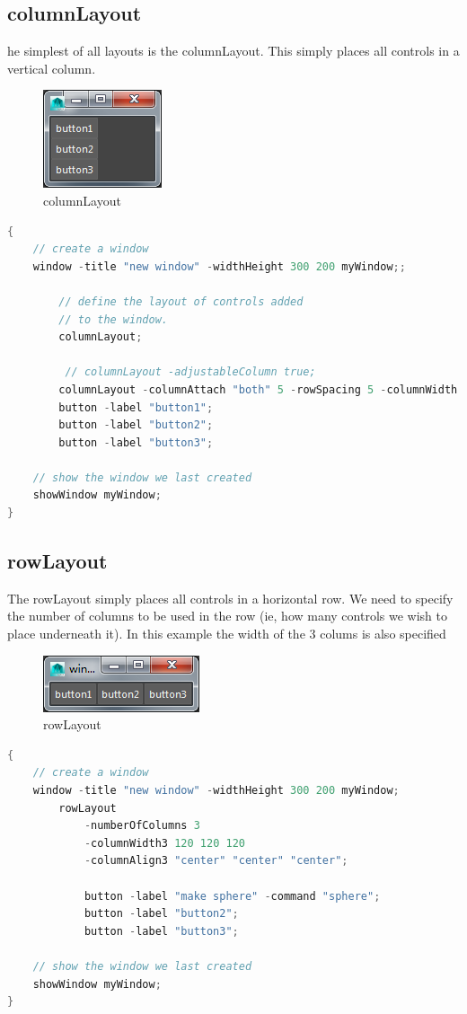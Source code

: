 \subsection{columnLayout}
he simplest of all layouts is the columnLayout. This simply places all controls in a vertical column.
\begin{figure}[tbh]
	\centering
	\includegraphics[width=0.3\linewidth]{figures/GUI/columnLayout}
	\caption{columnLayout}
	\label{fig:columnlayout}
\end{figure}

\begin{lstlisting}[language=C++]
{
	// create a window
	window -title "new window" -widthHeight 300 200 myWindow;;
	
		// define the layout of controls added 
		// to the window.
		columnLayout;
		
		 // columnLayout -adjustableColumn true;
		columnLayout -columnAttach "both" 5 -rowSpacing 5 -columnWidth 100;
		button -label "button1";
		button -label "button2";
		button -label "button3";
	
	// show the window we last created
	showWindow myWindow;
}
\end{lstlisting}


\subsection{rowLayout}
The rowLayout simply places all controls in a horizontal row. We need to specify the number of columns to be used in the row (ie, how many controls we wish to place underneath it). In this example the width of the 3 colums is also specified

\begin{figure}[tbh]
	\centering
	\includegraphics[width=0.2\linewidth]{figures/GUI/rowLayout}
	\caption{rowLayout}
	\label{fig:rowlayout}
\end{figure}

\begin{lstlisting}[language=C++]
{
	// create a window
	window -title "new window" -widthHeight 300 200 myWindow;
		rowLayout 
			-numberOfColumns 3 
			-columnWidth3 120 120 120
			-columnAlign3 "center" "center" "center";
			
			button -label "make sphere" -command "sphere";
			button -label "button2";
			button -label "button3";
	
	// show the window we last created
	showWindow myWindow;
}
\end{lstlisting}

